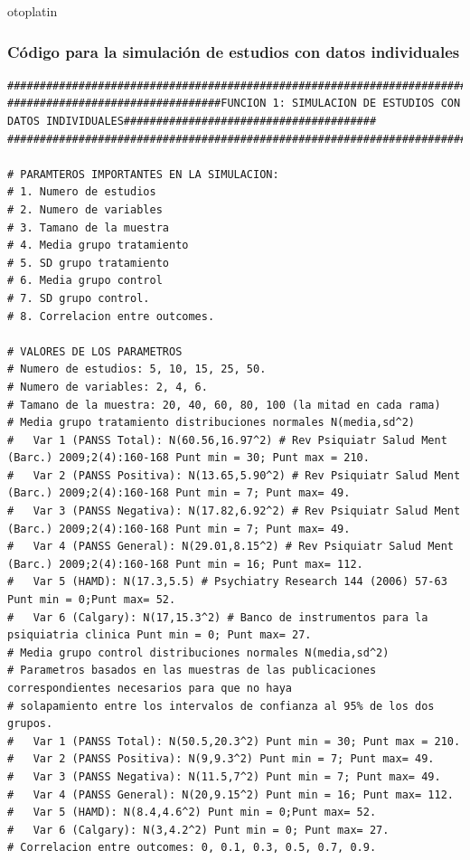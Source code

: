 otoplatin\documentclass[a4paper,openright,12pt]{report}
\begin{document}
\subsubsection{Código para la simulación de estudios con datos individuales}
{\tiny
\begin{verbatim}
################################################################################################################################
#################################FUNCION 1: SIMULACION DE ESTUDIOS CON DATOS INDIVIDUALES#######################################
################################################################################################################################

# PARAMTEROS IMPORTANTES EN LA SIMULACION:
# 1. Numero de estudios
# 2. Numero de variables
# 3. Tamano de la muestra
# 4. Media grupo tratamiento
# 5. SD grupo tratamiento
# 6. Media grupo control
# 7. SD grupo control.
# 8. Correlacion entre outcomes.

# VALORES DE LOS PARAMETROS
# Numero de estudios: 5, 10, 15, 25, 50.
# Numero de variables: 2, 4, 6.
# Tamano de la muestra: 20, 40, 60, 80, 100 (la mitad en cada rama) 
# Media grupo tratamiento distribuciones normales N(media,sd^2)
#   Var 1 (PANSS Total): N(60.56,16.97^2) # Rev Psiquiatr Salud Ment (Barc.) 2009;2(4):160-168 Punt min = 30; Punt max = 210.
#   Var 2 (PANSS Positiva): N(13.65,5.90^2) # Rev Psiquiatr Salud Ment (Barc.) 2009;2(4):160-168 Punt min = 7; Punt max= 49.
#   Var 3 (PANSS Negativa): N(17.82,6.92^2) # Rev Psiquiatr Salud Ment (Barc.) 2009;2(4):160-168 Punt min = 7; Punt max= 49.
#   Var 4 (PANSS General): N(29.01,8.15^2) # Rev Psiquiatr Salud Ment (Barc.) 2009;2(4):160-168 Punt min = 16; Punt max= 112.
#   Var 5 (HAMD): N(17.3,5.5) # Psychiatry Research 144 (2006) 57-63 Punt min = 0;Punt max= 52.
#   Var 6 (Calgary): N(17,15.3^2) # Banco de instrumentos para la psiquiatria clinica Punt min = 0; Punt max= 27.
# Media grupo control distribuciones normales N(media,sd^2)
# Parametros basados en las muestras de las publicaciones correspondientes necesarios para que no haya
# solapamiento entre los intervalos de confianza al 95% de los dos grupos.
#   Var 1 (PANSS Total): N(50.5,20.3^2) Punt min = 30; Punt max = 210.
#   Var 2 (PANSS Positiva): N(9,9.3^2) Punt min = 7; Punt max= 49.
#   Var 3 (PANSS Negativa): N(11.5,7^2) Punt min = 7; Punt max= 49.
#   Var 4 (PANSS General): N(20,9.15^2) Punt min = 16; Punt max= 112.
#   Var 5 (HAMD): N(8.4,4.6^2) Punt min = 0;Punt max= 52.
#   Var 6 (Calgary): N(3,4.2^2) Punt min = 0; Punt max= 27.
# Correlacion entre outcomes: 0, 0.1, 0.3, 0.5, 0.7, 0.9. 


\end{verbatim}}
\end{document}
